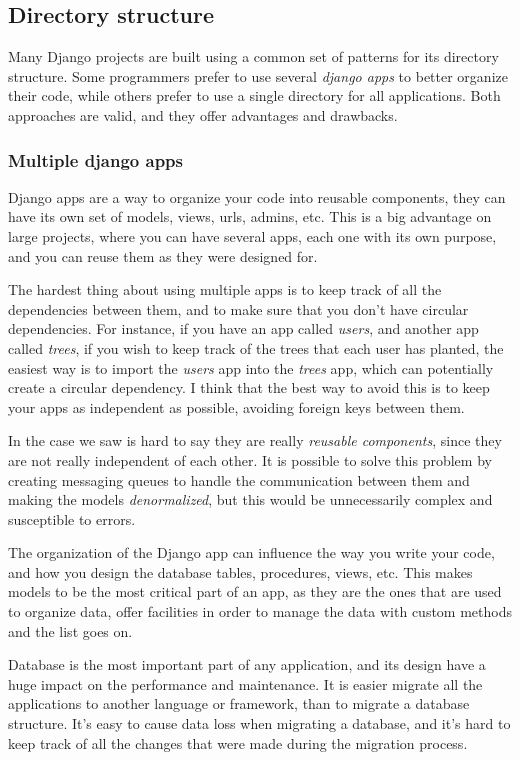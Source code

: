 \subsection{Directory structure}

Many Django projects are built using a common set of patterns for its directory structure.
Some programmers prefer to use several \textit{django apps} to better organize their code, while others prefer to use a
single directory for all applications.
Both approaches are valid, and they offer advantages and drawbacks.

\subsubsection{Multiple django apps}

Django apps are a way to organize your code into reusable components, they can have its own set of models, views, urls,
admins, etc.
This is a big advantage on large projects, where you can have several apps, each one with its own purpose, and you can
reuse them as they were designed for.

The hardest thing about using multiple apps is to keep track of all the dependencies between them, and to make sure that
you don't have circular dependencies.
For instance, if you have an app called \textit{users}, and another app called \textit{trees}, if you wish to keep track
of the trees that each user has planted, the easiest way is to import the \textit{users} app into the \textit{trees}
app, which can potentially create a circular dependency.
I think that the best way to avoid this is to keep your apps as independent as possible, avoiding foreign keys between them.

In the case we saw is hard to say they are really \textit{reusable components}, since they are not really independent of
each other.
It is possible to solve this problem by creating messaging queues to handle the communication between them and making
the models \textit{denormalized}, but this would be unnecessarily complex and susceptible to errors.

The organization of the Django app can influence the way you write your code, and how you design the database tables,
procedures, views, etc.
This makes models to be the most critical part of an app, as they are the ones that are used to organize data, offer
facilities in order to manage the data with custom methods and the list goes on.

Database is the most important part of any application, and its design have a huge impact on the performance and
maintenance.
It is easier migrate all the applications to another language or framework, than to migrate a database structure.
It's easy to cause data loss when migrating a database, and it's hard to keep track of all the changes that were made
during the migration process.


